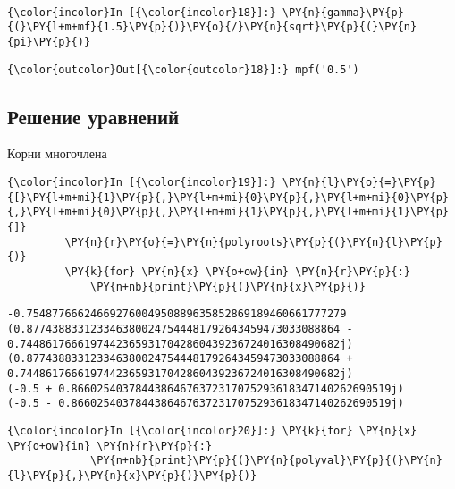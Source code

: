     \begin{center}
    \end{center}
    { \hspace*{\fill} \\}
    
    \begin{Verbatim}[commandchars=\\\{\}]
{\color{incolor}In [{\color{incolor}18}]:} \PY{n}{gamma}\PY{p}{(}\PY{l+m+mf}{1.5}\PY{p}{)}\PY{o}{/}\PY{n}{sqrt}\PY{p}{(}\PY{n}{pi}\PY{p}{)}
\end{Verbatim}

            \begin{Verbatim}[commandchars=\\\{\}]
{\color{outcolor}Out[{\color{outcolor}18}]:} mpf('0.5')
\end{Verbatim}
        
\subsection{Решение уравнений}
\label{mpmath3}

Корни многочлена

    \begin{Verbatim}[commandchars=\\\{\}]
{\color{incolor}In [{\color{incolor}19}]:} \PY{n}{l}\PY{o}{=}\PY{p}{[}\PY{l+m+mi}{1}\PY{p}{,}\PY{l+m+mi}{0}\PY{p}{,}\PY{l+m+mi}{0}\PY{p}{,}\PY{l+m+mi}{0}\PY{p}{,}\PY{l+m+mi}{1}\PY{p}{,}\PY{l+m+mi}{1}\PY{p}{]}
         \PY{n}{r}\PY{o}{=}\PY{n}{polyroots}\PY{p}{(}\PY{n}{l}\PY{p}{)}
         \PY{k}{for} \PY{n}{x} \PY{o+ow}{in} \PY{n}{r}\PY{p}{:}
             \PY{n+nb}{print}\PY{p}{(}\PY{n}{x}\PY{p}{)}
\end{Verbatim}

    \begin{Verbatim}[commandchars=\\\{\}]
-0.75487766624669276004950889635852869189460661777279
(0.8774388331233463800247544481792643459473033088864 - 0.74486176661974423659317042860439236724016308490682j)
(0.8774388331233463800247544481792643459473033088864 + 0.74486176661974423659317042860439236724016308490682j)
(-0.5 + 0.86602540378443864676372317075293618347140262690519j)
(-0.5 - 0.86602540378443864676372317075293618347140262690519j)

    \end{Verbatim}

    \begin{Verbatim}[commandchars=\\\{\}]
{\color{incolor}In [{\color{incolor}20}]:} \PY{k}{for} \PY{n}{x} \PY{o+ow}{in} \PY{n}{r}\PY{p}{:}
             \PY{n+nb}{print}\PY{p}{(}\PY{n}{polyval}\PY{p}{(}\PY{n}{l}\PY{p}{,}\PY{n}{x}\PY{p}{)}\PY{p}{)}
\end{Verbatim}

